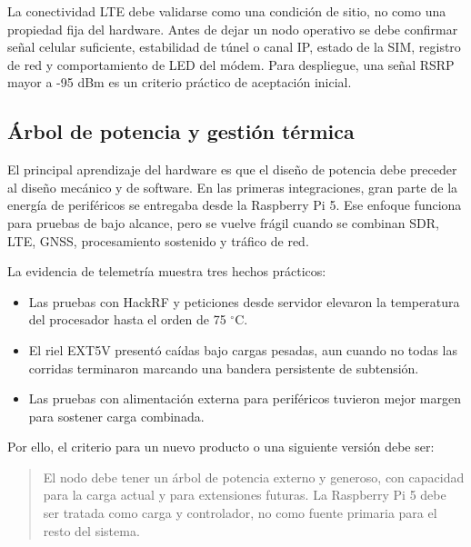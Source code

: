 La conectividad LTE debe validarse como una condición de sitio, no como una
propiedad fija del hardware. Antes de dejar un nodo operativo se debe confirmar
señal celular suficiente, estabilidad de túnel o canal IP, estado de la SIM,
registro de red y comportamiento de LED del módem. Para despliegue, una señal
RSRP mayor a -95 dBm es un criterio práctico de aceptación inicial.

\subsection{Árbol de potencia y gestión térmica}

El principal aprendizaje del hardware es que el diseño de potencia debe
preceder al diseño mecánico y de software. En las primeras integraciones, gran
parte de la energía de periféricos se entregaba desde la Raspberry Pi 5. Ese
enfoque funciona para pruebas de bajo alcance, pero se vuelve frágil cuando se
combinan SDR, LTE, GNSS, procesamiento sostenido y tráfico de red.

La evidencia de telemetría muestra tres hechos prácticos:

\begin{itemize}[leftmargin=*]
    \item Las pruebas con HackRF y peticiones desde servidor elevaron la
    temperatura del procesador hasta el orden de 75 $^\circ$C.
    \item El riel EXT5V presentó caídas bajo cargas pesadas, aun cuando no
    todas las corridas terminaron marcando una bandera persistente de
    subtensión.
    \item Las pruebas con alimentación externa para periféricos tuvieron mejor
    margen para sostener carga combinada.
\end{itemize}

Por ello, el criterio para un nuevo producto o una siguiente versión debe ser:

\begin{quote}
El nodo debe tener un árbol de potencia externo y generoso, con capacidad para
la carga actual y para extensiones futuras. La Raspberry Pi 5 debe ser tratada
como carga y controlador, no como fuente primaria para el resto del sistema.
\end{quote}

